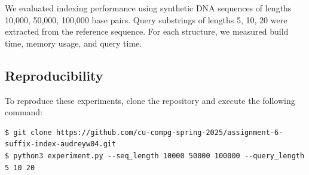 \documentclass[11pt, letterpaper]{article}
\begin{document}
We evaluated indexing performance using synthetic DNA sequences of lengths {10,000, 50,000, 100,000}
base pairs. Query substrings of lengths {5, 10, 20} were extracted from the reference sequence. For 
each structure, we measured build time, memory usage, and query time.

\subsection{Reproducibility}
To reproduce these experiments, clone the repository and execute the following command:

\begin{verbatim}
$ git clone https://github.com/cu-compg-spring-2025/assignment-6-suffix-index-audreyw04.git
$ python3 experiment.py --seq_length 10000 50000 100000 --query_length 5 10 20
\end{verbatim}
\end{document}
